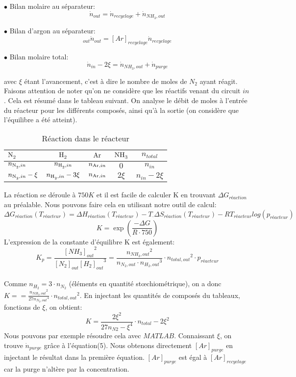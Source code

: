 \documentclass[a4paper, oneside, 12pt]{article}
\begin{document}
$\bullet$ Bilan molaire au séparateur:
\begin{equation}
\dot{n}_{out}=\dot{n}_{recyclage}+\dot{n}_{NH_3,out}
\end{equation}

$\bullet$ Bilan d'argon au séparateur:
\begin{equation}
[Ar]_{out} \dot{n}_{out}=[Ar]_{recyclage} \dot{n}_{recyclage}
\end{equation}

$\bullet$ Bilan molaire total:
\begin{equation}
\dot{n}_{in} - 2\xi=\dot{n}_{NH_3,out} + \dot{n}_{purge}
\end{equation}

avec $\xi$ étant l'avancement, c'est à dire le nombre de moles de $N_2$ ayant réagit. Faisons attention de noter qu'on ne considère que les réactifs venant du circuit $in$. Cela est résumé dans le tableau suivant. On analyse le débit de moles à l'entrée du réacteur pour les différents composés, ainsi qu'à la sortie (on considère que l'équilibre a été atteint).
\begin{table}
	\centering
	\begin{tabular}{l|c|c|c|c}
		$\ce{N2}$ & $\ce{H2}$ & $\ce{Ar}$ & $\ce{NH3}$ & $n_{total}$ \\
		\hline
		$n_{\ce{N2},in}$ & $n_{\ce{H2},in}$ & $n_{\ce{Ar},in}$ & $0$  & $n_{in}$\\
		$n_{\ce{N2},in}-\xi$ & $n_{\ce{H2},in}-3\xi$ & $n_{\ce{Ar},in}$ & $2\xi$  & $n_{in}-2\xi$\\
	\end{tabular}
	\caption{Réaction dans le réacteur}
	\label{tab:reaction1_primaire}
\end{table}
La réaction se déroule à $750K$ et il est facile de calculer K en trouvant $\Delta G_{réaction}$ au préalable. Nous pouvons faire cela en utilisant notre outil de calcul:\\
$$\Delta G_{réaction}(T_{réacteur})=\Delta H_{réaction}(T_{réacteur})-T_\cdot \Delta S_{réaction}(T_{réacteur})-RT_{réacteur}log(p_{réacteur})$$
$$K=\exp(\frac{-\Delta G}{R\cdot 750})$$
L'expression de la constante d'équilibre K est également: \\
$$K_p=\frac{{[NH_3]_{out}}^2}{[N_2]_{out}{[H_2]_{out}}^3}=\frac{{n_{NH_3,out}}^2}{n_{N_2,out}\cdot {n_{H_2,out}}^3}\cdot {n_{total,out}}^2\cdot p_{réacteur}$$\\
Comme $n_{H_2}=3\cdot n_{N_2}$ (éléments en quantité stœchiométrique), on a donc 
$K==\frac{{n_{NH_3,out}}^2}{27{n_{N_2,out}}^4}\cdot {n_{total,out}}^2$. En injectant les 
quantités de composés du tableaux, fonctions de $\xi$, on obtient:\\
$$K=\frac{{2\xi}^2}{27{{n_{N2}-\xi}^4}}\cdot {n_{total}-2\xi}^2$$
Nous pouvons par exemple résoudre cela avec $MATLAB$. Connaissant $\xi$, on trouve 
$\dot{n}_{purge}$ grâce à l'équation(5). Nous obtenons directement $[Ar]_{purge}$ en 
injectant le résultat dans la première équation. $[Ar]_{purge}$ est égal à $[Ar]_{recyclage}$ car la purge n'altère par la concentration.\\
\end{document}
